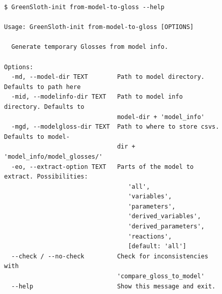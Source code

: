 \begin{figure}
\begin{lstlisting}[style=bashstyle, caption={\textbf{The from-model-to-gloss command of the CLI of \greensloth[GreenSlothUtils]}}, label={code:greenslothutils-from-model-to-gloss}]
$ GreenSloth-init from-model-to-gloss --help

Usage: GreenSloth-init from-model-to-gloss [OPTIONS]

  Generate temporary Glosses from model info.

Options:
  -md, --model-dir TEXT        Path to model directory. Defaults to path here
  -mid, --modelinfo-dir TEXT   Path to model info directory. Defaults to
                               model-dir + 'model_info'
  -mgd, --modelgloss-dir TEXT  Path to where to store csvs. Defaults to model-
                               dir + 'model_info/model_glosses/'
  -eo, --extract-option TEXT   Parts of the model to extract. Possibilities:
                                  'all',
                                  'variables',
                                  'parameters',
                                  'derived_variables',
                                  'derived_parameters',
                                  'reactions',
                                  [default: 'all']
  --check / --no-check         Check for inconsistencies with
                               'compare_gloss_to_model'
  --help                       Show this message and exit.
\end{lstlisting}
\end{figure}

